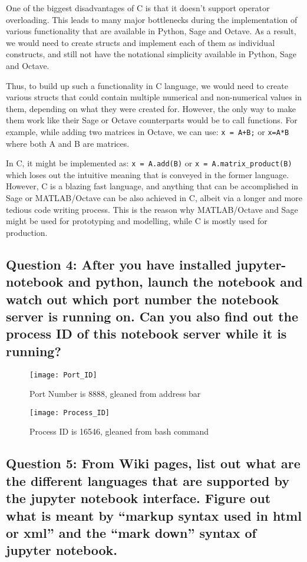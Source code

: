 \documentclass[12pt,a4paper]{article}
\begin{document}
One of the biggest disadvantages of C is that it doesn't support operator overloading. This leads to many major bottlenecks during the implementation of various functionality that are available in Python, Sage and Octave. As a result, we would need to create structs and implement each of them as individual constructs, and still not have the notational simplicity available in Python, Sage and Octave.

Thus, to build up such a functionality in C language, we would need to create various structs that could contain multiple numerical and non-numerical values in them, depending on what they were created for. However, the only way to make them work like their Sage or Octave counterparts would be to call functions. For example, while adding two matrices in Octave, we can use: \lstinline{x = A+B;} or \lstinline{x=A*B} where both A and B are matrices.

In C, it might be implemented as: \lstinline{x = A.add(B)} or \lstinline{x = A.matrix_product(B)} which loses out the intuitive meaning that is conveyed in the former language. However, C is a blazing fast language, and anything that can be accomplished in Sage or MATLAB/Octave can be also achieved in C, albeit via a longer and more tedious code writing process. This is the reason why MATLAB/Octave and Sage might be used for prototyping and modelling, while C is mostly used for production.

\pagebreak

\subsection{Question 4: After you have installed jupyter-notebook and python, launch the notebook and watch out which port number the notebook server is running on. Can you also find out the process ID of this notebook server while it is running?}

\begin{figure}[h]
	\texttt{[image: Port\_ID]}
	\caption{Port Number is 8888, gleaned from address bar}
\end{figure}
\begin{figure}[h]
	\texttt{[image: Process\_ID]}
	\caption{Process ID is 16546, gleaned from bash command}
\end{figure}

\pagebreak

\subsection{Question 5: From Wiki pages, list out what are the different languages that are supported by the jupyter notebook interface. Figure out what is meant by ``markup syntax used in html or xml'' and the ``mark down'' syntax of jupyter notebook.}
\end{document}
